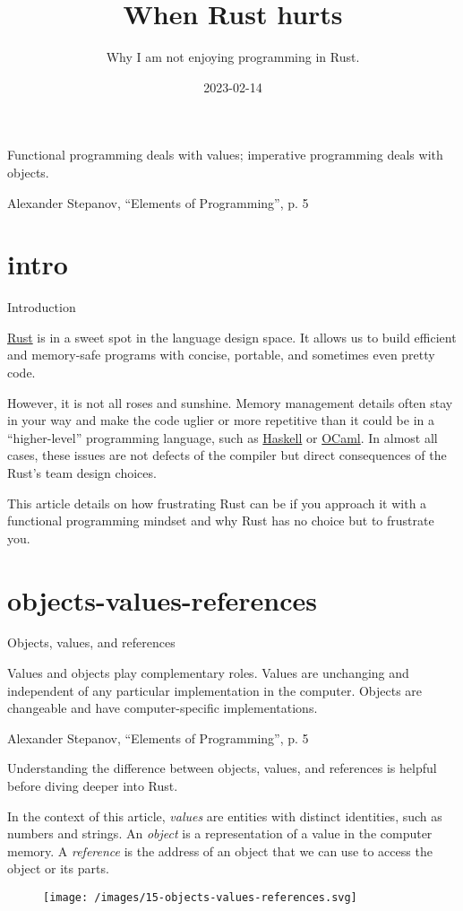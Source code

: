 \documentclass{article}
\title{When Rust hurts}
\subtitle{Why I am not enjoying programming in Rust.}
\date{2023-02-14}
\begin{document}
\epigraph{
  Functional programming deals with values; imperative programming deals with objects.
}{Alexander Stepanov, ``Elements of Programming'', p. 5}

\section{intro}{Introduction}

\href{https://www.rust-lang.org/}{Rust} is in a sweet spot in the language design space.
It allows us to build efficient and memory-safe programs with concise, portable, and sometimes even pretty code.

However, it is not all roses and sunshine.
Memory management details often stay in your way and make the code uglier or more repetitive than it could be in a ``higher-level'' programming language, such as \href{https://www.haskell.org/}{Haskell} or \href{https://ocaml.org}{OCaml}.
In almost all cases, these issues are not defects of the compiler but direct consequences of the Rust's team design choices.

This article details on how frustrating Rust can be if you approach it with a functional programming mindset and why Rust has no choice but to frustrate you.

\section{objects-values-references}{Objects, values, and references}
\epigraph{
    Values and objects play complementary roles.
    Values are unchanging and independent of any particular implementation in the computer.
    Objects are changeable and have computer-specific implementations.
}{Alexander Stepanov, ``Elements of Programming'', p. 5}

Understanding the difference between objects, values, and references is helpful before diving deeper into Rust.

In the context of this article, \emph{values} are entities with distinct identities, such as numbers and strings.
An \emph{object} is a representation of a value in the computer memory.
A \emph{reference} is the address of an object that we can use to access the object or its parts.

\begin{figure}[grayscale-diagram]
\texttt{[image: /images/15-objects-values-references.svg]}
\end{figure}
\end{document}
